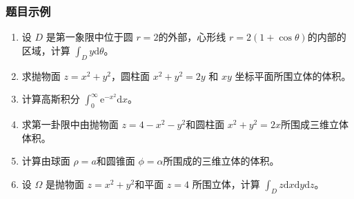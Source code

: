 \subsubsection{题目示例}
\begin{enumerate}
    \item 设 $D$ 是第一象限中位于圆 $r=2$的外部，心形线 $r=2(1+ \cos \theta)$的内部的区域，计算
    $\int _D y \mathrm{d} \theta$。

    \item 求抛物面 $z = x^2 + y^2$，圆柱面 $x^2 + y^2 = 2y$ 和 $xy$ 坐标平面所围立体的体积。

    \item 计算高斯积分 $\int _0 ^{\infty} \mathrm{e}^{-x^2} \mathrm{d} x$。

    \item 求第一卦限中由抛物面 $z = 4 - x^2 -y^2$和圆柱面 $x^2+ y^2=2x$所围成三维立体体积。

    \item 计算由球面 $\rho = a$和圆锥面 $\phi = \alpha $所围成的三维立体的体积。

    \item 设 $\Omega$ 是抛物面 $z = x^2 + y^2 $和平面 $z=4$ 所围立体，计算 $\int _D z \mathrm{d} x \mathrm{d} y \mathrm{d} z$。
\end{enumerate}

